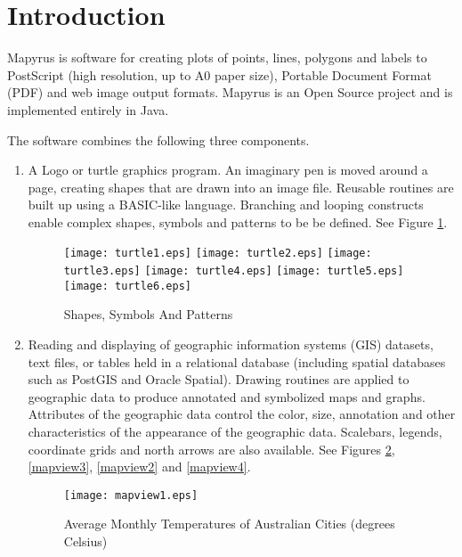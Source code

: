 
\section{Introduction}

Mapyrus is software for creating plots of points, lines, polygons and labels 
to PostScript (high resolution, up to A0 paper size),
Portable Document Format (PDF) and web image output formats.
Mapyrus is an Open Source project and is implemented entirely in Java.

The software combines the following three components.

\begin{enumerate}
\item

A Logo or turtle graphics program.
An imaginary pen is moved around a page,
creating shapes that are drawn into an image file.
Reusable routines are built up using a BASIC-like language.
Branching and looping constructs enable complex shapes, symbols and patterns
to be be defined.  See Figure \ref{turtle}.

\begin{figure}[htb]
\texttt{[image: turtle1.eps]}
\texttt{[image: turtle2.eps]}
\texttt{[image: turtle3.eps]}
\texttt{[image: turtle4.eps]}
\texttt{[image: turtle5.eps]}
\texttt{[image: turtle6.eps]}
\caption{Shapes, Symbols And Patterns}
\label{turtle}
\end{figure}

\item

Reading and displaying of geographic information
systems (GIS) datasets, text files, or tables held in a relational database
(including spatial databases such as PostGIS and Oracle Spatial).
Drawing routines are applied to geographic data to produce annotated and
symbolized maps and graphs.  Attributes of the geographic data control
the color, size, annotation and other characteristics of the
appearance of the geographic data.
Scalebars, legends, coordinate grids and north arrows are also available.
See Figures \ref{mapview1}, \ref{mapview3}, \ref{mapview2} and
\ref{mapview4}.

\begin{figure}
\texttt{[image: mapview1.eps]}
\caption[Average Monthly Temperatures]{Average Monthly Temperatures of Australian Cities (degrees Celsius)}
\label{mapview1}
\end{figure}


\end{enumerate}
